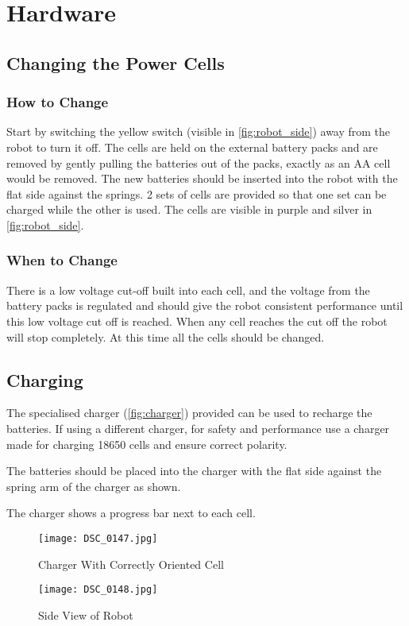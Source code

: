 
\section{Hardware}

\subsection{Changing the Power Cells}
\subsubsection{How to Change}
Start by switching the yellow switch (visible in \autoref{fig:robot_side}) away from the robot to turn it off. The cells are held on the external battery packs and are removed by gently pulling the batteries out of the packs, exactly as an AA cell would be removed.  The new batteries should be inserted into the robot with the flat side against the springs. 2 sets of cells are provided so that one set can be charged while the other is used. The cells are visible in purple and silver in \autoref{fig:robot_side}.

\subsubsection{When to Change}
There is a low voltage cut-off built into each cell, and the voltage from the battery packs is regulated and should give the robot consistent performance until this low voltage cut off is reached. When any cell reaches the cut off the robot will stop completely. At this time all the cells should be changed. 


\subsection{Charging}
The specialised charger (\autoref{fig:charger}) provided can be used to recharge the batteries. If using a different charger, for safety and performance use a charger made for charging 18650 cells and ensure correct polarity.

The batteries should be placed into the charger with the flat side against the spring arm of the charger as shown.

The charger shows a progress bar next to each cell. 


\begin{figure}[hp]
\centering
\texttt{[image: DSC\_0147.jpg]}
\caption{Charger With Correctly Oriented Cell}
\label{fig:charger}
\end{figure}
\begin{figure}[hp]
\centering
\texttt{[image: DSC\_0148.jpg]}
\caption{Side View of Robot}
\label{fig:robot_side}
\end{figure}



